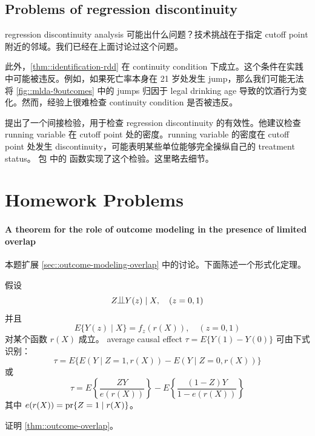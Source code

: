  
 
\subsection{Problems of regression discontinuity}\label{sec::problems-RD}


regression discontinuity analysis 可能出什么问题？技术挑战在于指定 cutoff point 附近的邻域。我们已经在上面讨论过这个问题。

此外，\cref{thm::identification-rdd} 在 continuity condition 下成立。这个条件在实践中可能被违反。例如，如果死亡率本身在 21 岁处发生 jump，那么我们可能无法将 \cref{fig::mlda-9outcomes} 中的 jumps 归因于 legal drinking age 导致的饮酒行为变化。然而，经验上很难检查 continuity condition 是否被违反。
 
 
\citet{mccrary2008manipulation} 提出了一个间接检验，用于检查 regression discontinuity 的有效性。他建议检查 running variable 在 cutoff point 处的密度。running variable 的密度在 cutoff point 处发生 discontinuity，可能表明某些单位能够完全操纵自己的 treatment status。 包  中的  函数实现了这个检验。这里略去细节。


 
 
\section{Homework Problems}

 

\paragraph{A theorem for the role of outcome modeling in the presence of limited overlap}\label{hw::outcome-modeling-overlap}

本题扩展 \cref{sec::outcome-modeling-overlap} 中的讨论。下面陈述一个形式化定理。

\begin{theorem}
\label{thm::outcome-overlap}
假设
$$
Z\ind Y(z) \mid X, \quad (z=0,1)
$$
并且
$$
E\{  Y(z) \mid X \} = f_z( r(X)   ),\quad (z=0,1)
$$
对某个函数 $r(X)$ 成立。
average causal effect $\tau = E\{ Y(1) - Y(0)  \}$ 可由下式识别：
$$
\tau =E\{   E(Y\mid Z=1, r(X)) - E(Y\mid Z=0, r(X)) \} 
$$
或
$$
\tau = E\left\{   \frac{ZY}{  e(r(X)) }  \right\}  - E\left\{   \frac{(1-Z)Y}{ 1 -  e(r(X)) }  \right\}
$$
其中 $e(r(X)) = \textup{pr}\{ Z=1\mid r(X) \}$。
\end{theorem}

证明 \cref{thm::outcome-overlap}。

